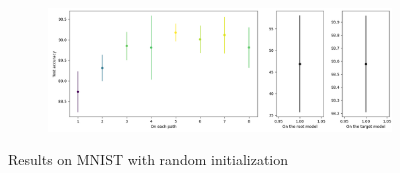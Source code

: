 \documentclass{article}
\begin{document}
\begin{figure}[htbp]
\begin{subfigure}[b]{0.29\textwidth}
    \end{subfigure}
    
    \vspace{0.5cm}
    
    \begin{subfigure}[b]{0.5\textwidth}
        \centering
        \includegraphics[width=\textwidth]{imgs/statistical_reliability_MNIST_random_2024_05_02_14_52_58.png}
    \end{subfigure}
    \caption{Results on MNIST with random initialization}
\end{figure}
\end{document}
